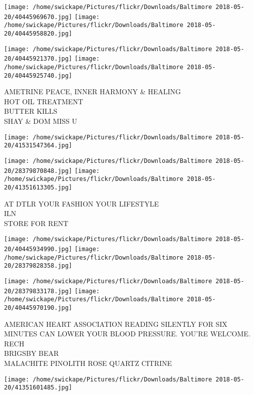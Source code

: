 \documentclass[10pt,letterpaper]{article}
\begin{document}
\texttt{[image: /home/swickape/Pictures/flickr/Downloads/Baltimore 2018-05-20/40445969670.jpg]}
\texttt{[image: /home/swickape/Pictures/flickr/Downloads/Baltimore 2018-05-20/40445958820.jpg]}

\texttt{[image: /home/swickape/Pictures/flickr/Downloads/Baltimore 2018-05-20/40445921370.jpg]}
\texttt{[image: /home/swickape/Pictures/flickr/Downloads/Baltimore 2018-05-20/40445925740.jpg]}

AMETRINE PEACE, INNER HARMONY \& HEALING\\
HOT OIL TREATMENT\\
BUTTER KILLS\\
SHAY \& DOM MISS U\\
\pagebreak

\texttt{[image: /home/swickape/Pictures/flickr/Downloads/Baltimore 2018-05-20/41531547364.jpg]}

\vspace{0.25in}
\texttt{[image: /home/swickape/Pictures/flickr/Downloads/Baltimore 2018-05-20/28379870848.jpg]}
\texttt{[image: /home/swickape/Pictures/flickr/Downloads/Baltimore 2018-05-20/41351613305.jpg]}

AT DTLR YOUR FASHION YOUR LIFESTYLE\\
ILN\\
STORE FOR RENT\\
\pagebreak

\texttt{[image: /home/swickape/Pictures/flickr/Downloads/Baltimore 2018-05-20/40445934990.jpg]}
\texttt{[image: /home/swickape/Pictures/flickr/Downloads/Baltimore 2018-05-20/28379828358.jpg]}

\texttt{[image: /home/swickape/Pictures/flickr/Downloads/Baltimore 2018-05-20/28379833178.jpg]}
\texttt{[image: /home/swickape/Pictures/flickr/Downloads/Baltimore 2018-05-20/40445970190.jpg]}

AMERICAN HEART ASSOCIATION READING SILENTLY FOR SIX MINUTES CAN LOWER YOUR BLOOD PRESSURE.  YOU'RE WELCOME.\\
RECH\\
BRIGSBY BEAR\\
MALACHITE PINOLITH ROSE QUARTZ CITRINE\\
\pagebreak

\texttt{[image: /home/swickape/Pictures/flickr/Downloads/Baltimore 2018-05-20/41351601485.jpg]}
\end{document}
